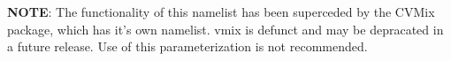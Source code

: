 \textbf{NOTE}: The functionality of this namelist has been superceded by the CVMix package, which has it's own namelist.  vmix is defunct and may be depracated in a future release.  Use of this parameterization is not recommended.
